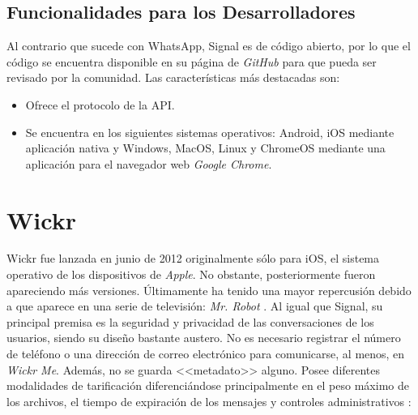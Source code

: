 \subsection{Funcionalidades para los Desarrolladores}
Al contrario que sucede con WhatsApp, Signal es de código abierto, por lo que el código se encuentra disponible en su página de \textit{GitHub} para que pueda ser revisado por la comunidad. Las características más destacadas son:

\begin{itemize}
	\item Ofrece el protocolo de la \acs{API}.
	\item Se encuentra en los siguientes sistemas operativos: Android, iOS mediante aplicación nativa y Windows, MacOS, Linux y ChromeOS mediante una aplicación para el navegador web \textit{Google Chrome}.
\end{itemize}

\section{Wickr}
\label{sec:wickr}

Wickr fue lanzada en junio de 2012 originalmente sólo para iOS, el sistema operativo de los dispositivos de \textit{Apple}. No obstante, posteriormente fueron apareciendo más versiones. Últimamente ha tenido una mayor repercusión debido a que aparece en una serie de televisión: \textit{Mr. Robot} \cite{Elio2016}. Al igual que Signal, su principal premisa es la seguridad y privacidad de las conversaciones de los usuarios, siendo su diseño bastante austero. No es necesario registrar el número de teléfono o una dirección de correo electrónico para comunicarse, al menos, en \textit{Wickr Me}. Además, no se guarda <<metadato>> alguno. Posee diferentes modalidades de tarificación diferenciándose principalmente en el peso máximo de los archivos, el tiempo de expiración de los mensajes y controles administrativos \cite{Wickr2017}:

